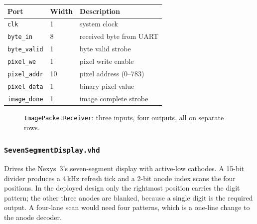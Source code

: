 \documentclass[11pt,a4paper]{article}
\begin{document}
\begin{center}
\small
\begin{tabularx}{\linewidth}{@{}llL@{}}
\toprule
\textbf{Port} & \textbf{Width} & \textbf{Description} \\
\midrule
\texttt{clk}          & 1  & system clock \\
\texttt{byte\_in}     & 8  & received byte from UART \\
\texttt{byte\_valid}  & 1  & byte valid strobe \\
\texttt{pixel\_we}    & 1  & pixel write enable \\
\texttt{pixel\_addr}  & 10 & pixel address (0--783) \\
\texttt{pixel\_data}  & 1  & binary pixel value \\
\texttt{image\_done}  & 1  & image complete strobe \\
\bottomrule
\end{tabularx}
\end{center}

\begin{figure}[H]
\centering
{}
\caption{\texttt{ImagePacketReceiver}: three inputs, four outputs, all on
  separate rows.}
\label{fig:pkt}
\end{figure}

\subsubsection{\texttt{SevenSegmentDisplay.vhd}}
\label{sub:seg}

Drives the Nexys~3's seven-segment display with active-low cathodes. A 15-bit
divider produces a 4\,kHz refresh tick and a 2-bit anode index scans the four
positions. In the deployed design only the rightmost position carries the digit
pattern; the other three anodes are blanked, because a single digit is the
required output. A four-lane scan would need four patterns, which is a one-line
change to the anode decoder.
\end{document}
